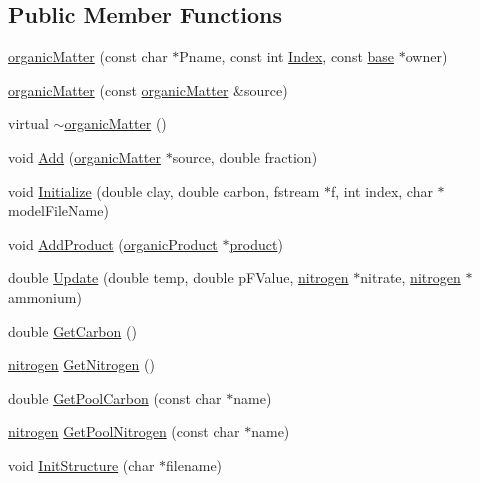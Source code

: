 \subsection*{Public Member Functions}
\begin{DoxyCompactItemize}
\item 
\hyperlink{classorganic_matter_ac425d01b777c572657394ead4c91657f}{organicMatter} (const char $\ast$Pname, const int \hyperlink{classbase_afa59aaa1a0201700640234eb13a03aae}{Index}, const \hyperlink{classbase}{base} $\ast$owner)
\item 
\hyperlink{classorganic_matter_ae373d5e017ff62f6fa3d3c3dc789d716}{organicMatter} (const \hyperlink{classorganic_matter}{organicMatter} \&source)
\item 
virtual \hyperlink{classorganic_matter_ad02ba3d5422d82ec8dd56b01e12c50fe}{$\sim$organicMatter} ()
\item 
void \hyperlink{classorganic_matter_af8e7ce68e31c09319d0b33d7f20a5100}{Add} (\hyperlink{classorganic_matter}{organicMatter} $\ast$source, double fraction)
\item 
void \hyperlink{classorganic_matter_af7bf4f5a06da9f6c4977c56d1bbb17ef}{Initialize} (double clay, double carbon, fstream $\ast$f, int index, char $\ast$modelFileName)
\item 
void \hyperlink{classorganic_matter_affa8ea4461d2badd187dc2fe9ef467d7}{AddProduct} (\hyperlink{classorganic_product}{organicProduct} $\ast$\hyperlink{classproduct}{product})
\item 
double \hyperlink{classorganic_matter_afe20379314e0eb234bd6b6c8684c41d4}{Update} (double temp, double pFValue, \hyperlink{classnitrogen}{nitrogen} $\ast$nitrate, \hyperlink{classnitrogen}{nitrogen} $\ast$ammonium)
\item 
double \hyperlink{classorganic_matter_a5b3f9588dde6550e0311a13cf5fe50f5}{GetCarbon} ()
\item 
\hyperlink{classnitrogen}{nitrogen} \hyperlink{classorganic_matter_a719b504d46e267423e58c37d1c1bc058}{GetNitrogen} ()
\item 
double \hyperlink{classorganic_matter_ae4953f5b42a97f95201b293633a89e17}{GetPoolCarbon} (const char $\ast$name)
\item 
\hyperlink{classnitrogen}{nitrogen} \hyperlink{classorganic_matter_a57c64ddc2f0aacaa27b4e2fb7e6c1713}{GetPoolNitrogen} (const char $\ast$name)
\item 
void \hyperlink{classorganic_matter_a571a15d4863954c5f1f2adbaca71e9bf}{InitStructure} (char $\ast$filename)
\item 

\end{DoxyCompactItemize}
